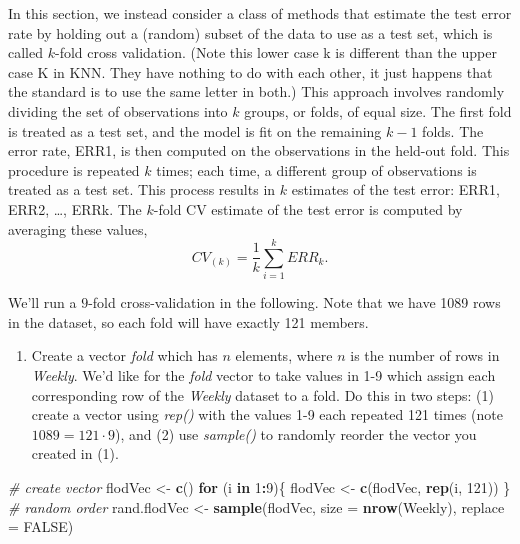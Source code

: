 \documentclass[]{article}
\newenvironment{Shaded}{\begin{snugshade}}{\end{snugshade}}
\newcommand{\CommentTok}[1]{\textcolor[rgb]{0.56,0.35,0.01}{\textit{#1}}}
\newcommand{\ControlFlowTok}[1]{\textcolor[rgb]{0.13,0.29,0.53}{\textbf{#1}}}
\newcommand{\DataTypeTok}[1]{\textcolor[rgb]{0.13,0.29,0.53}{#1}}
\newcommand{\DecValTok}[1]{\textcolor[rgb]{0.00,0.00,0.81}{#1}}
\newcommand{\KeywordTok}[1]{\textcolor[rgb]{0.13,0.29,0.53}{\textbf{#1}}}
\newcommand{\NormalTok}[1]{#1}
\newcommand{\OperatorTok}[1]{\textcolor[rgb]{0.81,0.36,0.00}{\textbf{#1}}}
\newcommand{\OtherTok}[1]{\textcolor[rgb]{0.56,0.35,0.01}{#1}}
\newcommand{\StringTok}[1]{\textcolor[rgb]{0.31,0.60,0.02}{#1}}
\providecommand{\tightlist}{%
  \setlength{\itemsep}{0pt}\setlength{\parskip}{0pt}}
\begin{document}
In this section, we instead consider a class of methods that estimate
the test error rate by holding out a (random) subset of the data to use
as a test set, which is called \(k\)-fold cross validation. (Note this
lower case k is different than the upper case K in KNN. They have
nothing to do with each other, it just happens that the standard is to
use the same letter in both.) This approach involves randomly dividing
the set of observations into \(k\) groups, or folds, of equal size. The
first fold is treated as a test set, and the model is fit on the
remaining \(k-1\) folds. The error rate, ERR1, is then computed on the
observations in the held-out fold. This procedure is repeated \(k\)
times; each time, a different group of observations is treated as a test
set. This process results in \(k\) estimates of the test error: ERR1,
ERR2, \ldots{}, ERRk. The \(k\)-fold CV estimate of the test error is
computed by averaging these values,
\[CV_{(k)} = \frac{1}{k}\sum_{i=1}^k ERR_k.\]

We'll run a \(9\)-fold cross-validation in the following. Note that we
have 1089 rows in the dataset, so each fold will have exactly 121
members.

\begin{enumerate}
\def\labelenumi{\arabic{enumi}.}
\setcounter{enumi}{4}
\tightlist
\item
  Create a vector \emph{fold} which has \(n\) elements, where \(n\) is
  the number of rows in \emph{Weekly}. We'd like for the \emph{fold}
  vector to take values in 1-9 which assign each corresponding row of
  the \emph{Weekly} dataset to a fold. Do this in two steps: (1) create
  a vector using \emph{rep()} with the values 1-9 each repeated 121
  times (note \(1089 = 121 \cdot 9\)), and (2) use \emph{sample()} to
  randomly reorder the vector you created in (1).
\end{enumerate}

\begin{Shaded}
\begin{Highlighting}[]
\CommentTok{# create vector}
\NormalTok{flodVec <-}\StringTok{ }\KeywordTok{c}\NormalTok{()}
\ControlFlowTok{for}\NormalTok{ (i }\ControlFlowTok{in} \DecValTok{1}\OperatorTok{:}\DecValTok{9}\NormalTok{)\{}
\NormalTok{  flodVec <-}\StringTok{ }\KeywordTok{c}\NormalTok{(flodVec, }\KeywordTok{rep}\NormalTok{(i, }\DecValTok{121}\NormalTok{))}
\NormalTok{\}}
\CommentTok{# random order}
\NormalTok{rand.flodVec <-}\StringTok{ }\KeywordTok{sample}\NormalTok{(flodVec, }\DataTypeTok{size =} \KeywordTok{nrow}\NormalTok{(Weekly), }\DataTypeTok{replace =} \OtherTok{FALSE}\NormalTok{)}
\end{Highlighting}
\end{Shaded}
\end{document}
